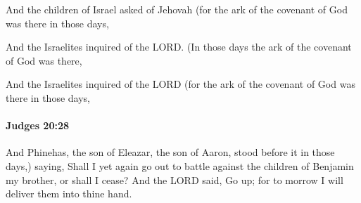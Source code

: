 			\begin{versebox}
					\item[BHS] 
					\item[ASV] And the children of Israel asked of Jehovah (for the ark of the covenant of God was there in those days,
					\item[NIV] And the Israelites inquired of the LORD. (In those days the ark of the covenant of God was there,
					\item[NRSV] And the Israelites inquired of the LORD (for the ark of the covenant of God was there in those days,
			\end{versebox}

		\paragraph{Judges 20:28} %
			\label{JUDGES-20-28}

			And Phinehas, the son of Eleazar, the son of Aaron, stood before it in those days,) saying, Shall I yet again go out to battle against the children of Benjamin my brother, or shall I cease? And the LORD said, Go up; for to morrow I will deliver them into thine hand.

